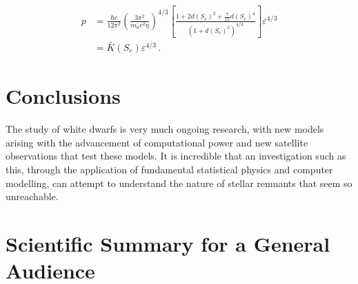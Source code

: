 \documentclass[aps,pra,10pt,twocolumn]{revtex4-2}
\begin{document}
\begin{align}
    p&=\frac{\hbar c}{12\pi^2}\left(\frac{3\pi^2}{m_n c^2\eta}\right)^{4/3}\left[\frac{1+2d(S_e)^2+\frac{7}{15}d(S_e)^4}{(1+d(S_e)^2)^{4/3}}\right]\varepsilon^{4/3}\\
    &=\bar{K}(S_e)\varepsilon^{4/3} \,.
    \label{eq:nondegeos}
\end{align}

\section{Conclusions}


The study of white dwarfs is very much ongoing research, with new models arising with the advancement of computational power and new satellite observations that test these models. It is incredible that an investigation such as this, through the application of fundamental statistical physics and computer modelling, can attempt to understand the nature of stellar remnants that seem so unreachable.

\nocite{*}


\clearpage

\onecolumngrid %

\section*{Scientific Summary for a General Audience}

\lipsum[1]
\end{document}

